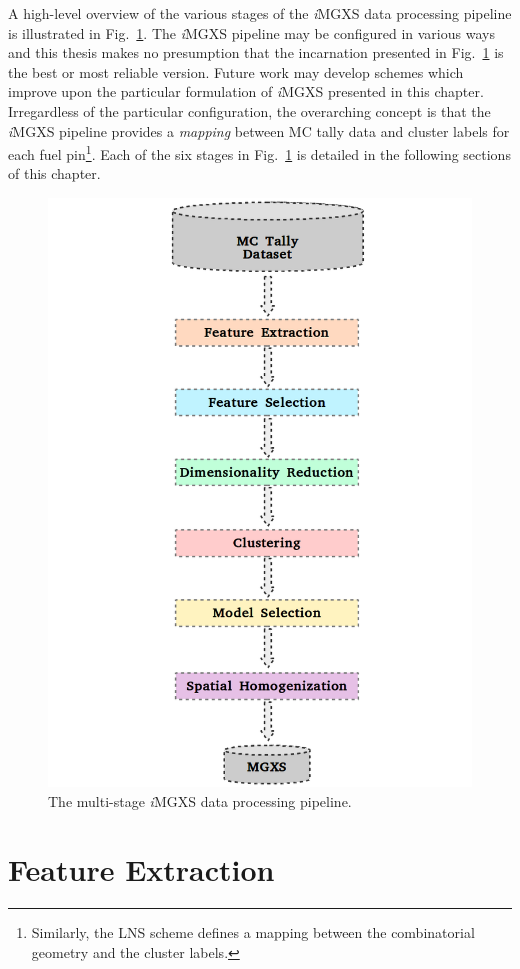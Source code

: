 A high-level overview of the various stages of the \textit{i}\ac{MGXS} data processing pipeline is illustrated in Fig.~\ref{fig:chap10-pipeline}. The \textit{i}\ac{MGXS} pipeline may be configured in various ways and this thesis makes no presumption that the incarnation presented in Fig.~\ref{fig:chap10-pipeline} is the best or most reliable version. Future work may develop schemes which improve upon the particular formulation of \textit{i}\ac{MGXS} presented in this chapter. Irregardless of the particular configuration, the overarching concept is that the \textit{i}\ac{MGXS} pipeline provides a \textit{mapping} between \ac{MC} tally data and cluster labels for each fuel pin\footnote{Similarly, the \ac{LNS} scheme defines a mapping between the combinatorial geometry and the cluster labels.}. Each of the six stages in Fig.~\ref{fig:chap10-pipeline} is detailed in the following sections of this chapter.

\begin{figure}[h!]
\centering
\includegraphics[width=0.655\linewidth]{figures/unsupervised/pipeline}
\vspace{2mm}
\caption[MGXS pipeline]{The multi-stage \textit{i}\ac{MGXS} data processing pipeline.}
\label{fig:chap10-pipeline}
\end{figure}


\section{Feature Extraction}
\label{sec:chap10-feature-extract}

